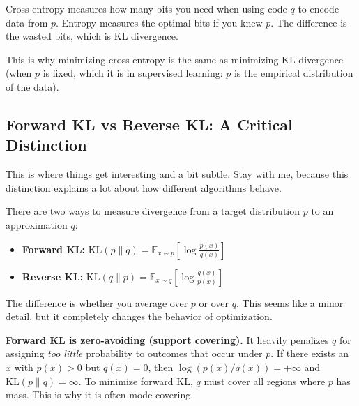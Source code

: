 Cross entropy measures how many bits you need when using code $q$ to encode data from $p$. Entropy measures the optimal bits if you knew $p$. The difference is the wasted bits, which is KL divergence.

\vspace{1em}

This is why minimizing cross entropy is the same as minimizing KL divergence (when $p$ is fixed, which it is in supervised learning: $p$ is the empirical distribution of the data).

\vspace{1.5em}

\subsection{Forward KL vs Reverse KL: A Critical Distinction}

This is where things get interesting and a bit subtle. Stay with me, because this distinction explains a lot about how different algorithms behave.

\vspace{1em}

There are two ways to measure divergence from a target distribution $p$ to an approximation $q$:

\begin{itemize}
\item \textbf{Forward KL:} $\text{KL}(p \| q) = \mathbb{E}_{x \sim p}\left[\log \frac{p(x)}{q(x)}\right]$

\item \textbf{Reverse KL:} $\text{KL}(q \| p) = \mathbb{E}_{x \sim q}\left[\log \frac{q(x)}{p(x)}\right]$
\end{itemize}

\vspace{1em}

The difference is whether you average over $p$ or over $q$. This seems like a minor detail, but it completely changes the behavior of optimization.

\vspace{1em}

\textbf{Forward KL is zero-avoiding (support covering).} It heavily penalizes $q$ for assigning \emph{too little} probability to outcomes that occur under $p$. If there exists an $x$ with $p(x) > 0$ but $q(x) = 0$, then $\log(p(x)/q(x)) = +\infty$ and $\text{KL}(p\|q)=\infty$. To minimize forward KL, $q$ must cover all regions where $p$ has mass. This is why it is often mode covering.

